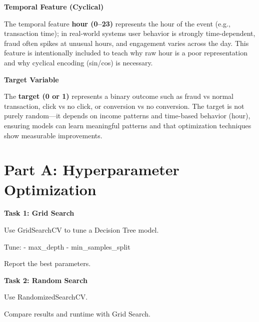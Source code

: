 \documentclass[12pt,a4paper]{article}
\begin{document}
    \textbf{Temporal Feature (Cyclical)}

The temporal feature \textbf{hour (0--23)} represents the hour of the event (e.g., transaction time); in real-world systems user behavior is strongly time-dependent, fraud often spikes at unusual hours, and engagement varies across the day. This feature is intentionally included to teach why raw hour is a poor representation and why cyclical encoding (sin/cos) is necessary.

    \textbf{Target Variable}

The \textbf{target (0 or 1)} represents a binary outcome such as fraud vs normal transaction, click vs no click, or conversion vs no conversion. The target is not purely random---it depends on income patterns and time-based behavior (hour), ensuring models can learn meaningful patterns and that optimization techniques show measurable improvements.


\section*{Part A: Hyperparameter Optimization}

\begin{tcolorbox}
\textbf{Task 1: Grid Search}

Use GridSearchCV to tune a Decision Tree model.

Tune:
- max\_depth  
- min\_samples\_split  

Report the best parameters.

\vspace{2cm}

\vspace{2cm}
\end{tcolorbox}

\vspace{6pt}

\begin{tcolorbox}
\textbf{Task 2: Random Search}

Use RandomizedSearchCV.

Compare results and runtime with Grid Search.

\vspace{2cm}

\vspace{2cm}
\end{tcolorbox}
\end{document}
